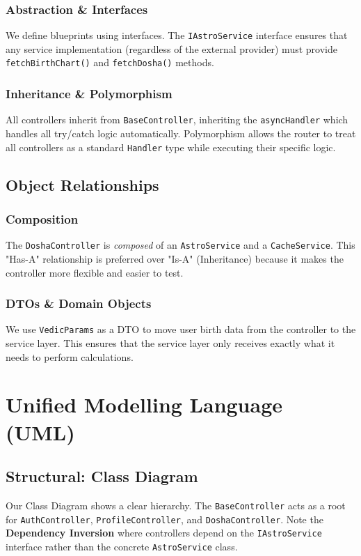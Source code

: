 \documentclass[12pt,a4paper]{article}
\begin{document}
\subsubsection{Abstraction \& Interfaces}
We define blueprints using interfaces. The \texttt{IAstroService} interface ensures that any service implementation (regardless of the external provider) must provide \texttt{fetchBirthChart()} and \texttt{fetchDosha()} methods.

\subsubsection{Inheritance \& Polymorphism}
All controllers inherit from \texttt{BaseController}, inheriting the \texttt{asyncHandler} which handles all try/catch logic automatically. Polymorphism allows the router to treat all controllers as a standard \texttt{Handler} type while executing their specific logic.

\subsection{Object Relationships}
\subsubsection{Composition}
The \texttt{DoshaController} is \textit{composed} of an \texttt{AstroService} and a \texttt{CacheService}. This "Has-A" relationship is preferred over "Is-A" (Inheritance) because it makes the controller more flexible and easier to test.

\subsubsection{DTOs \& Domain Objects}
We use \texttt{VedicParams} as a DTO to move user birth data from the controller to the service layer. This ensures that the service layer only receives exactly what it needs to perform calculations.

\section{Unified Modelling Language (UML)}

\subsection{Structural: Class Diagram}
Our Class Diagram shows a clear hierarchy. The \texttt{BaseController} acts as a root for \texttt{AuthController}, \texttt{ProfileController}, and \texttt{DoshaController}. Note the \textbf{Dependency Inversion} where controllers depend on the \texttt{IAstroService} interface rather than the concrete \texttt{AstroService} class.
\end{document}
